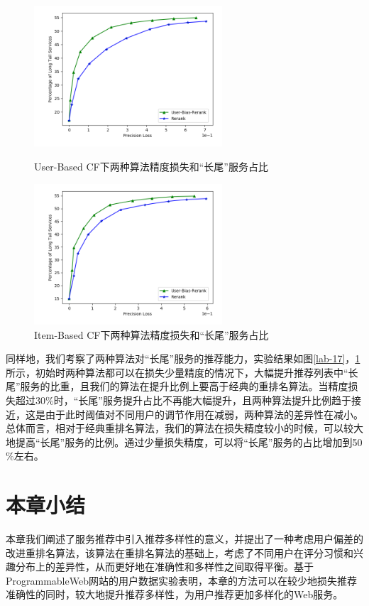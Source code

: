 \documentclass[master,winfonts]{njuthesis}
\begin{document}
\begin{figure}[htbp]
\centering
\begin{minipage}[t]{0.48\textwidth}
\centering
\includegraphics[width=7cm]{diversity_7.png}
\caption{User-Based CF下两种算法精度损失和“长尾”服务占比}\label{lab-17}
\end{minipage}
\begin{minipage}[t]{0.48\textwidth}
\centering
\includegraphics[width=7cm]{diversity_8.png}
\caption{Item-Based CF下两种算法精度损失和“长尾”服务占比}\label{lab-18}
\end{minipage}
\end{figure}

同样地，我们考察了两种算法对“长尾”服务的推荐能力，实验结果如图\ref{lab-17}，\ref{lab-18}所示，初始时两种算法都可以在损失少量精度的情况下，大幅提升推荐列表中“长尾”服务的比重，且我们的算法在提升比例上要高于经典的重排名算法。当精度损失超过30$\%$时，“长尾”服务提升占比不再能大幅提升，且两种算法提升比例趋于接近，这是由于此时阈值对不同用户的调节作用在减弱，两种算法的差异性在减小。总体而言，相对于经典重排名算法，我们的算法在损失精度较小的时候，可以较大地提高“长尾”服务的比例。通过少量损失精度，可以将“长尾”服务的占比增加到50$\%$左右。



\section{本章小结}
本章我们阐述了服务推荐中引入推荐多样性的意义，并提出了一种考虑用户偏差的改进重排名算法，该算法在重排名算法的基础上，考虑了不同用户在评分习惯和兴趣分布上的差异性，从而更好地在准确性和多样性之间取得平衡。基于ProgrammableWeb网站的用户数据实验表明，本章的方法可以在较少地损失推荐准确性的同时，较大地提升推荐多样性，为用户推荐更加多样化的Web服务。
\end{document}
